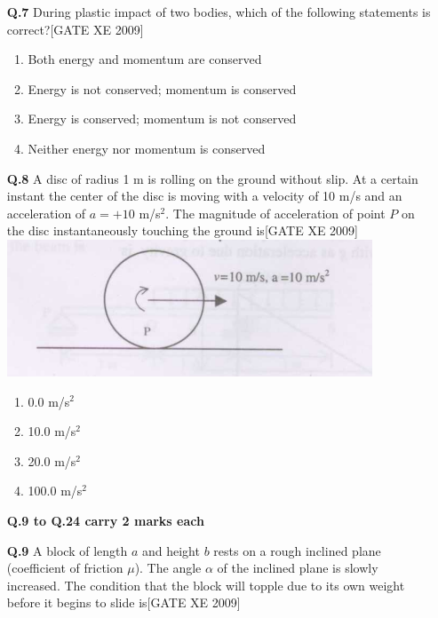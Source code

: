 \documentclass[journal,12pt,onecolumn]{IEEEtran}
\theoremstyle{remark}
\begin{document}
\begin{enumerate}
\begin{enumerate}
\vspace{0.3cm}

\item[\textbf{Q.7}] During plastic impact of two bodies, which of the following statements is correct?\hfill[GATE XE 2009]\\
\begin{multicols}{2}
\begin{enumerate}
    \item Both energy and momentum are conserved
    \item Energy is not conserved; momentum is conserved
    \item Energy is conserved; momentum is not conserved
    \item Neither energy nor momentum is conserved
\end{enumerate}
\end{multicols}


\vspace{0.3cm}

\item[\textbf{Q.8}] A disc of radius 1 m is rolling on the ground without slip. At a certain instant the center of the disc is moving with a velocity of 10 m/s and an acceleration of $a = + 10$ m/s$^2$. The magnitude of acceleration of point $P$ on the disc instantaneously touching the ground is\hfill[GATE XE 2009]\\

   \includegraphics[width=0.5\columnwidth]{figs/fig10.png}



\begin{multicols}{2}
\begin{enumerate}
    \item 0.0 m/s$^2$
    \item 10.0 m/s$^2$
    \item 20.0 m/s$^2$
    \item 100.0 m/s$^2$
\end{enumerate}
\end{multicols}


\bigskip
\Large\textbf{Q.9 to Q.24 carry 2 marks each}
\item[\textbf{Q.9}] A block of length $a$ and height $b$ rests on a rough inclined plane (coefficient of friction $\mu$). The angle $\alpha$ of the inclined plane is slowly increased. The condition that the block will topple due to its own weight before it begins to slide is\hfill[GATE XE 2009]\\


\end{enumerate}
\end{enumerate}
\end{document}
